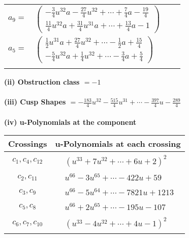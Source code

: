 \documentclass[1p]{elsarticle_modified}
\theoremstyle{definition}
\begin{document}
\begin{tabular}{m{7pt} m{180pt} m{7pt} m{180pt} }
\flushright $a_{9}=$&$\begin{pmatrix}-\frac{3}{4} u^{32} a-\frac{27}{4} u^{32}+\cdots+\frac{7}{4} a-\frac{19}{4}\\\frac{11}{4} u^{32} a+\frac{31}{4} u^{31} a+\cdots+\frac{13}{4} a-1\end{pmatrix}$ \\
\flushright $a_{5}=$&$\begin{pmatrix}\frac{1}{2} u^{31} a+\frac{27}{4} u^{32}+\cdots-\frac{1}{2} a+\frac{15}{4}\\-\frac{5}{4} u^{32} a+\frac{1}{4} u^{32}+\cdots-\frac{3}{4} a+\frac{5}{4}\end{pmatrix}$\\&\end{tabular}
\flushleft \textbf{(ii) Obstruction class $= -1$}\\~\\
\flushleft \textbf{(iii) Cusp Shapes $= -\frac{183}{4} u^{32}-\frac{515}{4} u^{31}+\cdots-\frac{397}{4} u-\frac{289}{4}$}\\~\\
\newpage\renewcommand{\arraystretch}{1}
\flushleft \textbf{(iv) u-Polynomials at the component}\newline \\
\begin{tabular}{m{50pt}|m{274pt}}
Crossings & \hspace{64pt}u-Polynomials at each crossing \\
\hline $$\begin{aligned}c_{1},c_{4},c_{12}\end{aligned}$$&$\begin{aligned}
&(u^{33}+7 u^{32}+\cdots+6 u+2)^{2}
\end{aligned}$\\
\hline $$\begin{aligned}c_{2},c_{11}\end{aligned}$$&$\begin{aligned}
&u^{66}-3 u^{65}+\cdots-422 u+59
\end{aligned}$\\
\hline $$\begin{aligned}c_{3},c_{9}\end{aligned}$$&$\begin{aligned}
&u^{66}-5 u^{64}+\cdots-7821 u+1213
\end{aligned}$\\
\hline $$\begin{aligned}c_{5},c_{8}\end{aligned}$$&$\begin{aligned}
&u^{66}+2 u^{65}+\cdots-195 u-107
\end{aligned}$\\
\hline $$\begin{aligned}c_{6},c_{7},c_{10}\end{aligned}$$&$\begin{aligned}
&(u^{33}-4 u^{32}+\cdots+4 u-1)^{2}
\end{aligned}$\\
\hline
\end{tabular}\\~\\
\end{document}
